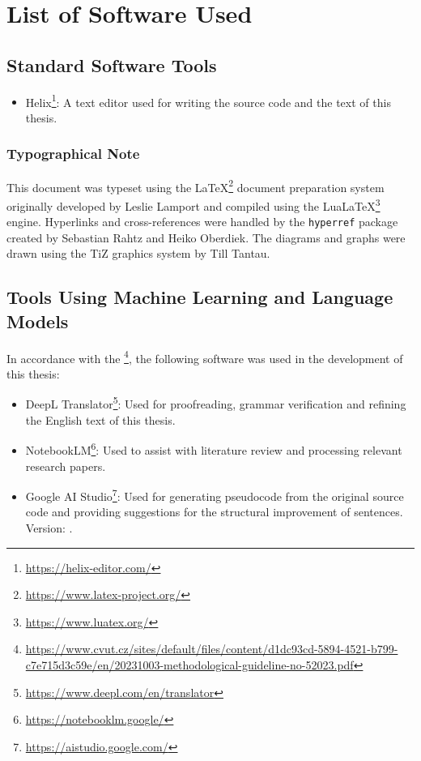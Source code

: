 \chapter{List of Software Used}\label{app:C}

\section{Standard Software Tools}
\begin{itemize}
    \item Helix\footnote{\url{https://helix-editor.com/}}: A text editor used for writing the source code and the text of this thesis.
\end{itemize}

\subsection*{Typographical Note}
This document was typeset using the \LaTeX{}\footnote{\url{https://www.latex-project.org/}} document preparation system originally developed by Leslie Lamport and compiled using the Lua\LaTeX{}\footnote{\url{https://www.luatex.org/}} engine. Hyperlinks and cross-references were handled by the \texttt{hyperref} package created by Sebastian Rahtz and Heiko Oberdiek. The diagrams and graphs were drawn using the TiZ graphics system by Till Tantau.

\section{Tools Using Machine Learning and Language Models}
In accordance with the \footnote{\url{https://www.cvut.cz/sites/default/files/content/d1dc93cd-5894-4521-b799-c7e715d3c59e/en/20231003-methodological-guideline-no-52023.pdf}}, the following software was used in the development of this thesis:
\begin{itemize}
    \item DeepL Translator\footnote{\url{https://www.deepl.com/en/translator}}: Used for proofreading, grammar verification and refining the English text of this thesis.
    \item NotebookLM\footnote{\url{https://notebooklm.google/}}: Used to assist with literature review and processing relevant research papers.
    \item Google AI Studio\footnote{\url{https://aistudio.google.com/}}: Used for generating pseudocode from the original source code and providing suggestions for the structural improvement of sentences. Version: .
\end{itemize}

